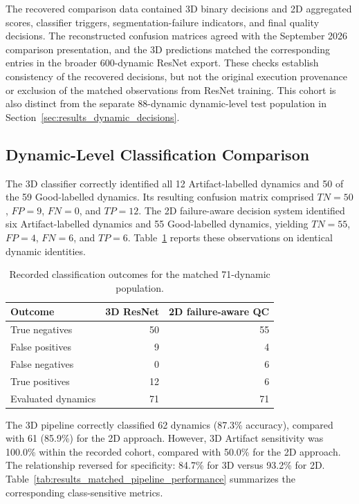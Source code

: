 The recovered comparison data contained 3D binary decisions and 2D aggregated scores, classifier triggers, segmentation-failure indicators, and final quality decisions. The reconstructed confusion matrices agreed with the September 2026 comparison presentation, and the 3D predictions matched the corresponding entries in the broader 600-dynamic ResNet export. These checks establish consistency of the recovered decisions, but not the original execution provenance or exclusion of the matched observations from ResNet training. This cohort is also distinct from the separate 88-dynamic dynamic-level test population in Section~\ref{sec:results_dynamic_decisions}.

\subsection{Dynamic-Level Classification Comparison}
\label{subsec:results_matched_pipeline_metrics}

The 3D classifier correctly identified all 12 Artifact-labelled dynamics and 50 of the 59 Good-labelled dynamics. Its resulting confusion matrix comprised $TN=50$, $FP=9$, $FN=0$, and $TP=12$. The 2D failure-aware decision system identified six Artifact-labelled dynamics and 55 Good-labelled dynamics, yielding $TN=55$, $FP=4$, $FN=6$, and $TP=6$. Table~\ref{tab:results_matched_pipeline_confusion} reports these observations on identical dynamic identities.

\begin{table}[htbp]
\centering
\caption{Recorded classification outcomes for the matched 71-dynamic population.}
\label{tab:results_matched_pipeline_confusion}
\begin{tabular}{lrr}
\hline
Outcome & 3D ResNet & 2D failure-aware QC \\
\hline
True negatives & 50 & 55 \\
False positives & 9 & 4 \\
False negatives & 0 & 6 \\
True positives & 12 & 6 \\
\hline
Evaluated dynamics & 71 & 71 \\
\hline
\end{tabular}
\end{table}

The 3D pipeline correctly classified 62 dynamics (87.3\% accuracy), compared with 61 (85.9\%) for the 2D approach. However, 3D Artifact sensitivity was 100.0\% within the recorded cohort, compared with 50.0\% for the 2D approach. The relationship reversed for specificity: 84.7\% for 3D versus 93.2\% for 2D. Table~\ref{tab:results_matched_pipeline_performance} summarizes the corresponding class-sensitive metrics.


